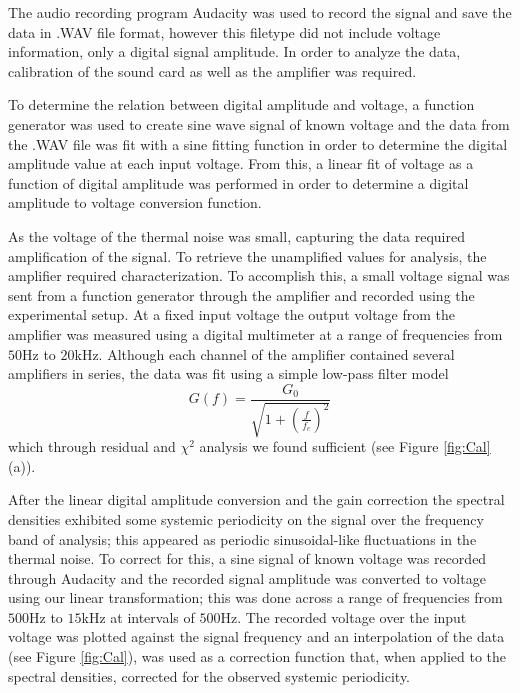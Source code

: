 \documentclass[aps,prl,twocolumn,superscriptaddress]{revtex4-1}
\begin{document}
The audio recording program Audacity was used to record the signal and save the data in .WAV file format, however this filetype did not include voltage information, only a digital signal amplitude. In order to analyze the data, calibration of the sound card as well as the amplifier was required. 

To determine the relation between digital amplitude and voltage, a function generator was used to create sine wave signal of known voltage and the data from the .WAV file was fit with a sine fitting function in order to determine the digital amplitude value at each input voltage. From this, a linear fit of voltage as a function of digital amplitude was performed in order to determine a digital amplitude to voltage conversion function.

As the voltage of the thermal noise was small, capturing the data required amplification of the signal. To retrieve the unamplified values for analysis, the amplifier required characterization. To accomplish this, a small voltage signal was sent from a function generator through the amplifier and recorded using the experimental setup. At a fixed input voltage the output voltage from the amplifier was measured using a digital multimeter at a range of frequencies from $50$Hz to $20$kHz. Although each channel of the amplifier contained several amplifiers in series, the data was fit using a simple low-pass filter model 
\begin{equation} \label{eq:Gain}
	G(f) = \frac{G_0}{\sqrt{1 + \left(\frac{f}{f_c}\right)^2}}
\end{equation} which through residual and $\chi^2$ analysis we found sufficient (see Figure \ref{fig:Cal} (a)).

After the linear digital amplitude conversion and the gain correction the spectral densities exhibited some systemic periodicity on the signal over the frequency band of analysis; this appeared as periodic sinusoidal-like fluctuations in the thermal noise. To correct for this, a sine signal of known voltage was recorded through Audacity and the recorded signal amplitude was converted to voltage using our linear transformation; this was done across a range of frequencies from $500$Hz to $15$kHz at intervals of $500$Hz. The recorded voltage over the input voltage was plotted against the signal frequency and an interpolation of the data (see Figure \ref{fig:Cal}), was used as a correction function that, when applied to the spectral densities, corrected for the observed systemic periodicity.
\end{document}
